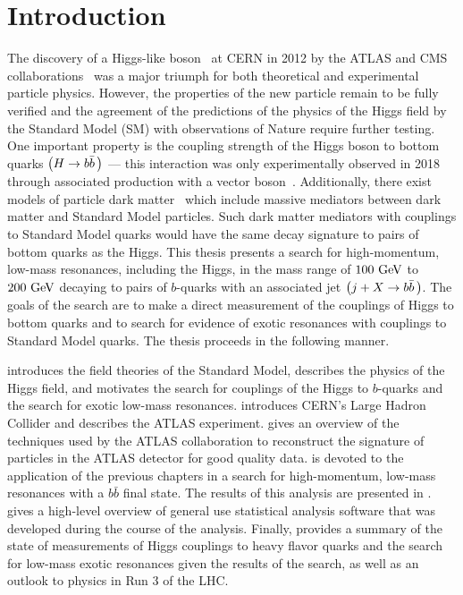 \chapter{Introduction}\label{chapter:introduction}

The discovery of a Higgs-like boson~\cite{Higgs:1964ia,Higgs:1964pj,Higgs:1966ev,Englert:1964et,Guralnik:1964eu} at CERN in 2012 by the \Gls{ATLAS} and CMS collaborations~\cite{Aad:2012tfa,Chatrchyan:2012xdj} was a major triumph for both theoretical and experimental particle physics.
However, the properties of the new particle remain to be fully verified and the agreement of the predictions of the physics of the Higgs field by the \Gls{Standard Model} (SM) with observations of Nature require further testing.
One important property is the coupling strength of the Higgs boson to bottom quarks $\left(H \to b\bar{b}\,\right)$ --- this interaction was only experimentally observed in 2018 through associated production with a vector boson~\cite{Aaboud:2018zhk,CMS:2018abb}.
Additionally, there exist models of particle dark matter~\cite{Abdallah:2015ter} which include massive mediators between dark matter and Standard Model particles.
Such \glspl{dark matter mediator} with couplings to Standard Model quarks would have the same decay signature to pairs of bottom quarks as the Higgs.
This thesis presents a search for high-momentum, low-mass resonances, including the Higgs, in the mass range of $100~\mathrm{GeV}$ to $200~\mathrm{GeV}$ decaying to pairs of $b$-quarks with an associated jet $\left(j + X \to b\bar{b}\,\right)$.
The goals of the search are to make a direct measurement of the couplings of Higgs to bottom quarks and to search for evidence of exotic resonances with couplings to Standard Model quarks.
The thesis proceeds in the following manner.

 introduces the field theories of the Standard Model, describes the physics of the Higgs field, and motivates the search for couplings of the Higgs to $b$-quarks and the search for exotic low-mass resonances.
 introduces CERN's Large Hadron Collider and  describes the ATLAS experiment.
 gives an overview of the techniques used by the ATLAS collaboration to reconstruct the signature of particles in the ATLAS detector for good quality data.
 is devoted to the application of the previous chapters in a search for high-momentum, low-mass resonances with a $b\bar{b}$ final state.
The results of this analysis are presented in .
 gives a high-level overview of general use statistical analysis software that was developed during the course of the analysis.
Finally,  provides a summary of the state of measurements of Higgs couplings to heavy flavor quarks and the search for low-mass exotic resonances given the results of the search, as well as an outlook to physics in Run 3 of the LHC.
